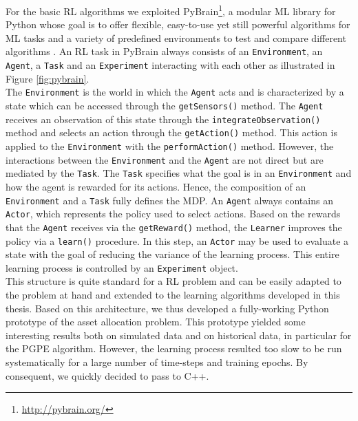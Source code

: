 For the basic RL algorithms we exploited PyBrain\footnote{\url{http://pybrain.org/}}, a modular ML library for Python whose goal is to offer flexible, easy-to-use yet still powerful algorithms for ML tasks and a variety of predefined environments to test and compare different algorithms \cite{pybrain2010jmlr}. An RL task in PyBrain always consists of an \lstinline{Environment}, an \lstinline{Agent}, a \lstinline{Task} and an \lstinline{Experiment} interacting with each other as illustrated in Figure \ref{fig:pybrain}.\\
The \lstinline{Environment} is the world in which the \lstinline{Agent} acts and is characterized by a state which can be accessed through the \lstinline{getSensors()} method. The \lstinline{Agent} receives an observation of this state through the \lstinline{integrateObservation()} method and selects an action through the \lstinline{getAction()} method. This action is applied to the \lstinline{Environment} with the \lstinline{performAction()} method. However, the interactions between the \lstinline{Environment} and the \lstinline{Agent} are not direct but are mediated by the \lstinline{Task}. The \lstinline{Task} specifies what the goal is in an \lstinline{Environment} and how the agent is rewarded for its actions. Hence, the composition of an \lstinline{Environment} and a \lstinline{Task} fully defines the MDP. An \lstinline{Agent} always contains an \lstinline{Actor}, which represents the policy used to select actions. Based on the rewards that the \lstinline{Agent} receives via the \lstinline{getReward()} method, the \lstinline{Learner} improves the policy via a \lstinline{learn()} procedure. In this step, an \lstinline{Actor} may be used to evaluate a state with the goal of reducing the variance of the learning process. This entire learning process is controlled by an \lstinline{Experiment} object.\\ 
This structure is quite standard for a RL problem and can be easily adapted to the problem at hand and extended to the learning algorithms developed in this thesis. Based on this architecture, we thus developed a fully-working Python prototype of the asset allocation problem. This prototype yielded some interesting results both on simulated data and on historical data, in particular for the PGPE algorithm. However, the learning process resulted too slow to be run systematically for a large number of time-steps and training epochs. By consequent, we quickly decided to pass to C++.